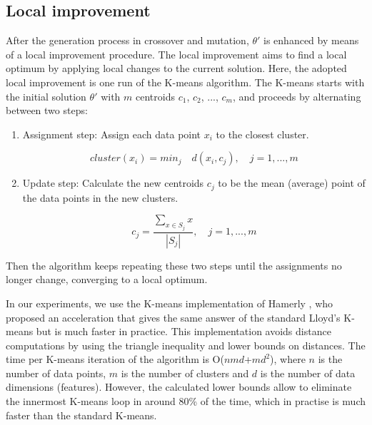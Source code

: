 \subsection{Local improvement}
\label{subsec:local-improvement}
After the generation process in crossover and mutation, $\theta'$ is enhanced by means of a local improvement procedure. The local improvement aims to find a local optimum by applying local changes to the current solution. Here, the adopted local improvement is one run of the K-means algorithm. The K-means starts with the initial solution $\theta'$ with $m$ centroids $c_1$, $c_2$, ..., $c_m$, and proceeds by alternating between two steps:

\begin{enumerate}

	\item Assignment step: Assign each data point $x_i$ to the closest cluster.
	
	\begin{equation}
	cluster(x_i) = min_j \quad d(x_i, c_j), \quad j = 1,...,m
	\end{equation}
	
	\item Update step: Calculate the new centroids $c_j$ to be the mean (average) point of the data points in the new clusters.
	
	\begin{equation}
	c_j = \frac{\sum_{x \in S_j}x}{\left | S_j \right |}, \quad j = 1,...,m
	\end{equation}
		
\end{enumerate}

Then the algorithm keeps repeating these two steps until the assignments no longer change, converging to a local optimum.

In our experiments, we use the K-means implementation of Hamerly \cite{Hamerly2010}, who proposed an acceleration that gives the same answer of the standard Lloyd's K-means \cite{Lloyd1982} but is much faster in practice. This implementation avoids distance computations by using the triangle inequality and lower bounds on distances. The time per K-means iteration of the algorithm is O($nmd$+$md^2$), where $n$ is the number of data points, $m$ is the number of clusters and $d$ is the number of data dimensions (features). However, the calculated lower bounds allow to eliminate the innermost K-means loop in around 80\% of the time, which in practise is much faster than the standard K-means.

